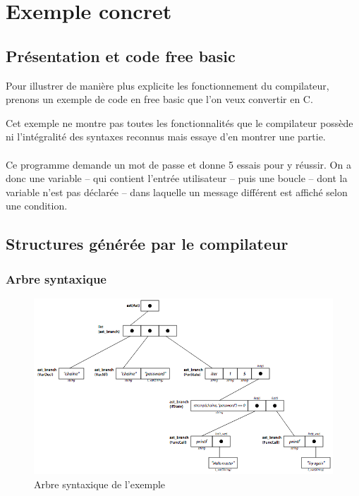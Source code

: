 \documentclass{article}
\begin{document}
\section{Exemple concret}
\subsection{Présentation et code free basic}
Pour illustrer de manière plus explicite les fonctionnement du compilateur, prenons un 
exemple de code en free basic que l'on veux convertir en C.

\lstset{language=c,caption=Exemple en free basic}


Cet exemple ne montre pas toutes les fonctionnalités que le compilateur possède ni 
l'intégralité des syntaxes reconnus mais essaye d'en montrer une partie.
\\\\
Ce programme demande un mot de passe et donne 5 essais pour y réussir. On a donc une 
variable -- qui contient l'entrée utilisateur -- puis une boucle -- dont la variable 
n'est pas déclarée -- dans laquelle un message différent est affiché selon une condition.

\subsection{Structures générée par le compilateur}
\subsubsection*{Arbre syntaxique}
\begin{landscape}
	\begin{figure}[h]
    		\centering
    		\includegraphics[scale=0.65]{resources/exemple_arbre.png}
    		\caption{Arbre syntaxique de l'exemple}
	\end{figure}
\end{landscape}
\end{document}
